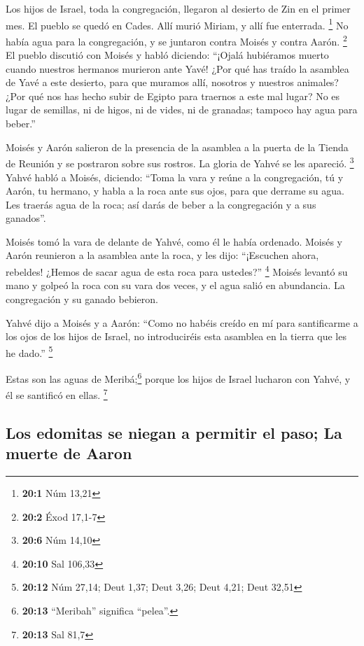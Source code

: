 \begin{paracol}{2}
 Los hijos de Israel, toda la congregación, llegaron al
desierto de Zin en el primer mes. El pueblo se quedó en Cades. Allí
murió Miriam, y allí fue enterrada. \footnote{\textbf{20:1} Núm 13,21}
 No había agua para la congregación, y se juntaron contra
Moisés y contra Aarón. \footnote{\textbf{20:2} Éxod 17,1-7}
 El pueblo discutió con Moisés y habló diciendo: ``¡Ojalá
hubiéramos muerto cuando nuestros hermanos murieron ante Yavé!
 ¿Por qué has traído la asamblea de Yavé a este desierto,
para que muramos allí, nosotros y nuestros animales?  ¿Por
qué nos has hecho subir de Egipto para traernos a este mal lugar? No es
lugar de semillas, ni de higos, ni de vides, ni de granadas; tampoco hay
agua para beber.''

 Moisés y Aarón salieron de la presencia de la asamblea a
la puerta de la Tienda de Reunión y se postraron sobre sus rostros. La
gloria de Yahvé se les apareció. \footnote{\textbf{20:6} Núm 14,10}
 Yahvé habló a Moisés, diciendo:  ``Toma la
vara y reúne a la congregación, tú y Aarón, tu hermano, y habla a la
roca ante sus ojos, para que derrame su agua. Les traerás agua de la
roca; así darás de beber a la congregación y a sus ganados''.

 Moisés tomó la vara de delante de Yahvé, como él le había
ordenado.  Moisés y Aarón reunieron a la asamblea ante la
roca, y les dijo: ``¡Escuchen ahora, rebeldes! ¿Hemos de sacar agua de
esta roca para ustedes?'' \footnote{\textbf{20:10} Sal 106,33}
 Moisés levantó su mano y golpeó la roca con su vara dos
veces, y el agua salió en abundancia. La congregación y su ganado
bebieron.

 Yahvé dijo a Moisés y a Aarón: ``Como no habéis creído
en mí para santificarme a los ojos de los hijos de Israel, no
introduciréis esta asamblea en la tierra que les he dado.'' \footnote{\textbf{20:12}
  Núm 27,14; Deut 1,37; Deut 3,26; Deut 4,21; Deut 32,51}

 Estas son las aguas de Meribá;\footnote{\textbf{20:13}
  ``Meribah'' significa ``pelea''.} porque los hijos de Israel lucharon
con Yahvé, y él se santificó en ellas. \footnote{\textbf{20:13} Sal 81,7}

\hypertarget{los-edomitas-se-niegan-a-permitir-el-paso-la-muerte-de-aaron}{%
\subsection{Los edomitas se niegan a permitir el paso; La muerte de
Aaron}\label{los-edomitas-se-niegan-a-permitir-el-paso-la-muerte-de-aaron}}


\end{paracol}
